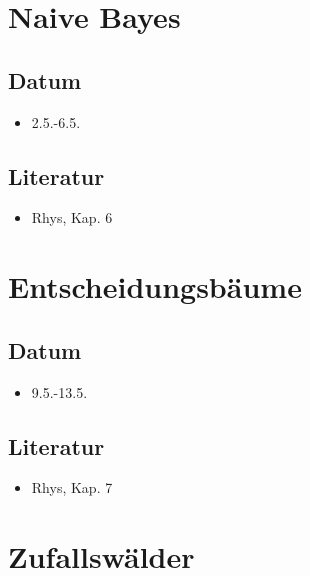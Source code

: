 \documentclass[
]{book}
\providecommand{\tightlist}{%
  \setlength{\itemsep}{0pt}\setlength{\parskip}{0pt}}
\begin{document}
\hypertarget{naive-bayes}{%
\section{Naive Bayes}\label{naive-bayes}}

\hypertarget{datum-7}{%
\subsection{Datum}\label{datum-7}}

\begin{itemize}
\tightlist
\item
  2.5.-6.5.
\end{itemize}

\hypertarget{literatur-7}{%
\subsection{Literatur}\label{literatur-7}}

\begin{itemize}
\tightlist
\item
  Rhys, Kap. 6
\end{itemize}

\hypertarget{entscheidungsbuxe4ume}{%
\section{Entscheidungsbäume}\label{entscheidungsbuxe4ume}}

\hypertarget{datum-8}{%
\subsection{Datum}\label{datum-8}}

\begin{itemize}
\tightlist
\item
  9.5.-13.5.
\end{itemize}

\hypertarget{literatur-8}{%
\subsection{Literatur}\label{literatur-8}}

\begin{itemize}
\tightlist
\item
  Rhys, Kap. 7
\end{itemize}

\hypertarget{zufallswuxe4lder}{%
\section{Zufallswälder}\label{zufallswuxe4lder}}
\end{document}
